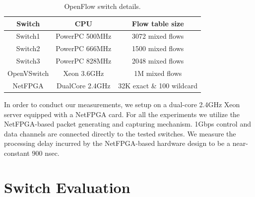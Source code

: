 \begin{table}[h!]
  \begin{center}
{
  \begin{tabular}{ |c | c | c | }
    \hline                        
    \textbf{Switch} & \textbf{CPU} & \textbf{Flow table size} \\
    \hline  
    Switch1 & PowerPC 500MHz & 3072 mixed flows \\
    \hline  
    Switch2 & PowerPC 666MHz & 1500 mixed flows \\
    \hline  
    Switch3 & PowerPC 828MHz & 2048 mixed flows \\
    \hline  
    OpenVSwitch & Xeon 3.6GHz & 1M mixed flows \\
    \hline  
    NetFPGA &  DualCore 2.4GHz & 32K exact \& 100 wildcard \\
    \hline 
  \end{tabular}  

}
\end{center}
\caption{OpenFlow switch details.}
\label{tbl:switch_list}
\end{table}

In order to conduct our measurements, we setup \oflops on a dual-core 2.4GHz
Xeon server equipped with a NetFPGA card.  For all the experiments we utilize
the NetFPGA-based packet generating and capturing mechanism. 1Gbps control and
data channels are connected directly to the tested switches. We measure the
processing delay incurred by the NetFPGA-based hardware design to be a
near-constant $900$ nsec.

\section{Switch Evaluation}\label{sec:oflops-result}


